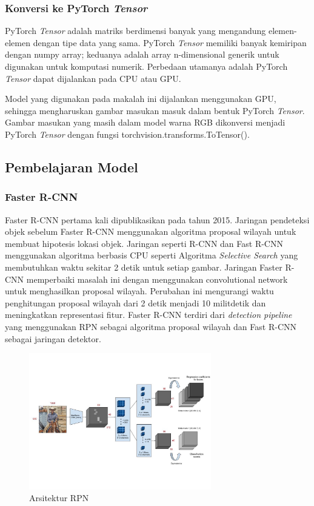 \documentclass{article}
\begin{document}
	  	\subsubsection{Konversi ke PyTorch \textit{Tensor}}
	  	PyTorch \textit{Tensor} adalah matriks berdimensi banyak yang mengandung elemen-elemen dengan tipe data yang sama. PyTorch \textit{Tensor} memiliki banyak kemiripan dengan numpy array; keduanya adalah array n-dimensional generik untuk digunakan untuk komputasi numerik. Perbedaan utamanya adalah PyTorch \textit{Tensor} dapat dijalankan pada CPU atau GPU.
	  	\par
	  	Model yang digunakan pada makalah ini dijalankan menggunakan GPU, sehingga mengharuskan gambar masukan masuk dalam bentuk PyTorch \textit{Tensor}. Gambar masukan yang masih dalam model warna RGB dikonversi menjadi PyTorch \textit{Tensor} dengan fungsi torchvision.transforms.ToTensor(). 
  	\subsection{Pembelajaran Model}
  	 \subsubsection{Faster R-CNN}
  	 \par Faster R-CNN pertama kali dipublikasikan pada tahun 2015. Jaringan pendeteksi objek sebelum Faster R-CNN menggunakan algoritma proposal wilayah untuk membuat hipotesis lokasi objek. Jaringan seperti R-CNN dan Fast R-CNN menggunakan algoritma berbasis CPU seperti Algoritma \textit{Selective Search} yang membutuhkan waktu sekitar 2 detik untuk setiap gambar. Jaringan Faster R-CNN memperbaiki masalah ini dengan menggunakan convolutional network untuk menghasilkan proposal wilayah. Perubahan ini mengurangi waktu penghitungan proposal wilayah dari 2 detik menjadi 10 militdetik dan meningkatkan representasi fitur. Faster R-CNN terdiri dari \textit{detection pipeline} yang menggunakan RPN sebagai algoritma proposal wilayah dan Fast R-CNN sebagai jaringan detektor.\cite{shilpa_2020}
  	 
  	 \begin{figure}[H]
  	 	\centering
  	 	\includegraphics[width=300px]{arsitektur/RPN.jpeg}
  	 	\caption{Arsitektur RPN}
  	 \end{figure}
   
\end{document}
